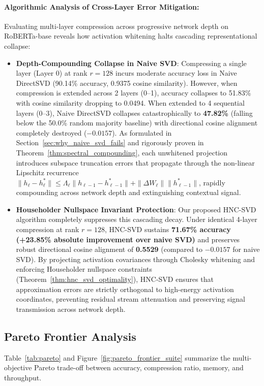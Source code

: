 \documentclass{article}
\begin{document}


\paragraph{Algorithmic Analysis of Cross-Layer Error Mitigation:}
Evaluating multi-layer compression across progressive network depth on RoBERTa-base reveals how activation whitening halts cascading representational collapse:
\begin{itemize}
    \item \textbf{Depth-Compounding Collapse in Naive SVD}: Compressing a single layer (Layer 0) at rank $r=128$ incurs moderate accuracy loss in Naive DirectSVD (90.14\% accuracy, 0.9375 cosine similarity). However, when compression is extended across 2 layers (0--1), accuracy collapses to 51.83\% with cosine similarity dropping to 0.0494. When extended to 4 sequential layers (0--3), Naive DirectSVD collapses catastrophically to \textbf{47.82\%} (falling below the 50.0\% random majority baseline) with directional cosine alignment completely destroyed ($-0.0157$). As formulated in Section~\ref{sec:why_naive_svd_fails} and rigorously proven in Theorem~\ref{thm:spectral_compounding}, each unwhitened projection introduces subspace truncation errors that propagate through the non-linear Lipschitz recurrence $\|h_\ell - h_\ell^*\| \le \Lambda_\ell \|h_{\ell-1} - h_{\ell-1}^*\| + \|\Delta W_\ell\| \|h_{\ell-1}^*\|$, rapidly compounding across network depth and extinguishing contextual signal.
    \item \textbf{Householder Nullspace Invariant Protection}: Our proposed HNC-SVD algorithm completely suppresses this cascading decay. Under identical 4-layer compression at rank $r=128$, HNC-SVD sustains \textbf{71.67\% accuracy (+23.85\% absolute improvement over naive SVD)} and preserves robust directional cosine alignment of \textbf{0.5529} (compared to $-0.0157$ for naive SVD). By projecting activation covariances through Cholesky whitening and enforcing Householder nullspace constraints (Theorem~\ref{thm:hnc_svd_optimality}), HNC-SVD ensures that approximation errors are strictly orthogonal to high-energy activation coordinates, preventing residual stream attenuation and preserving signal transmission across network depth.
\end{itemize}

\subsection{Pareto Frontier Analysis}
Table~\ref{tab:pareto} and Figure~\ref{fig:pareto_frontier_suite} summarize the multi-objective Pareto trade-off between accuracy, compression ratio, memory, and throughput.
\end{document}
